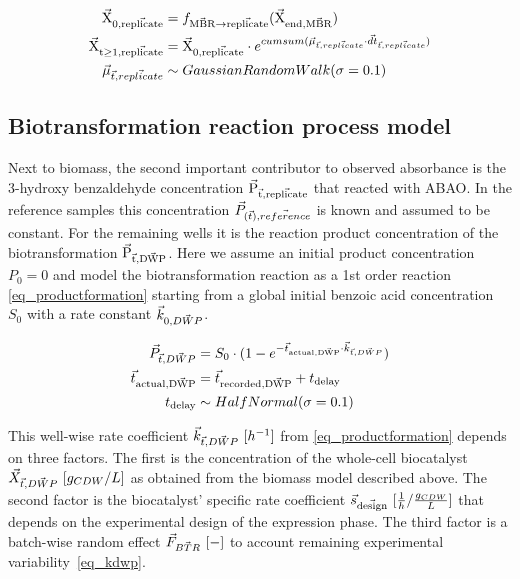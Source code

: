 \documentclass[sn-standardnature]{sn-jnl}%
\def\vec{\mathaccent "017E\relax }
\theoremstyle{thmstyleone}%
\theoremstyle{thmstyletwo}%
\theoremstyle{thmstylethree}%
\begin{document}
\begin{equation}
\begin{aligned}
    \mathrm{\vec{X}_{0,\vec{replicate}}} &= f_\mathrm{\vec{MBR}\rightarrow \vec{replicate}}(\mathrm{\vec{X}_{end,\vec{MBR}}}) \\
    \mathrm{\vec{X}_{t \ge 1,\vec{replicate}}} &= \mathrm{\vec{X}_{0,\vec{replicate}}} \cdot e^{cumsum(\vec{\mu}_{\vec{t},\vec{replicate}} \cdot \vec{dt}_{\vec{t},\vec{replicate}})}\\
    \vec{\mu}_{\vec{t},\vec{replicate}} &\sim GaussianRandomWalk(\sigma=0.1) \\
\end{aligned}
\label{eq_Xrandomwalk}
\end{equation}


\subsection{Biotransformation reaction process model}
\label{sec_product_model}

Next to biomass, the second important contributor to observed absorbance is the 3-hydroxy benzaldehyde concentration $\mathrm{\vec{P}_{\vec{t},\vec{replicate}}}$ that reacted with ABAO.
In the reference samples this concentration $\vec{P}_{(\vec{t}),\vec{reference}}$ is known and assumed to be constant.
For the remaining wells it is the reaction product concentration of the biotransformation $\mathrm{\vec{P}_{\vec{t},\vec{DWP}}}$.
Here we assume an initial product concentration $P_0=0$ and model the biotransformation reaction as a 1st order reaction \eqref{eq_productformation} starting from a global initial benzoic acid concentration $S_0$ with a rate constant $\vec{k}_{0,\vec{DWP}}$.

\begin{equation}
\begin{aligned}
    \vec{P}_{\vec{t},\vec{DWP}} &= S_0 \cdot (1 - e^{-\vec{t}_\mathrm{actual,\vec{DWP}} \cdot \vec{k}_{\vec{t},\vec{DWP}}}) \\
    \vec{t}_\mathrm{actual,\vec{DWP}} &= \vec{t}_\mathrm{recorded,\vec{DWP}} + t_\mathrm{delay} \\
    t_\mathrm{delay} &\sim HalfNormal(\sigma = 0.1)
\end{aligned}
\label{eq_productformation}
\end{equation}

This well-wise rate coefficient $\vec{k}_{\vec{t},\vec{DWP}}\ [h^{-1}]$ from \eqref{eq_productformation} depends on three factors.
The first is the concentration of the whole-cell biocatalyst $\vec{X}_{\vec{t},\vec{DWP}}\ [g_{CDW}/L]$ as obtained from the biomass model described above.
The second factor is the biocatalyst' specific rate coefficient $\vec{s}_\mathrm{\vec{design}}\ [\frac{1}{h} / \frac{g_{CDW}}{L}]$ that depends on the experimental design of the expression phase.
The third factor is a batch-wise random effect $\vec{F}_{\vec{BTR}}\ [-]$ to account remaining experimental variability~\eqref{eq_kdwp}.
\end{document}
